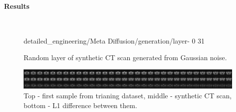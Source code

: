 \paragraph{Results}\mbox{}\\

\begin{figure}[H]
    \centering
    {detailed_engineering/Meta Diffusion/generation/layer-}%
    {0}%
    {31}%
    \caption{Random layer of synthetic CT scan generated from Gaussian noise.}
    \label{fig:my_label}
\end{figure}

\begin{figure}[H]
    \centering
    \includegraphics[width=\linewidth]{detailed_engineering/Meta Diffusion/charts/meta_diffusion_comparison.png}
    \caption{Top - first sample from trianing dataset, middle - synthetic CT scan, bottom - L1 difference between them.}
    \label{fig:ldm-success-comparison}
\end{figure}